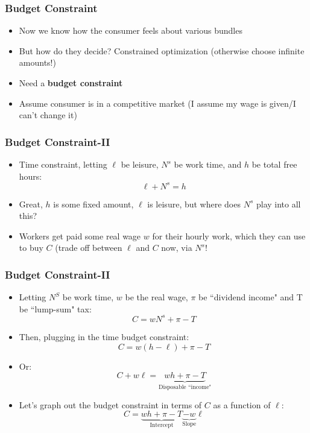 \documentclass{beamer}
\begin{document}
\begin{frame}
\frametitle[alignment=center]{Budget Constraint}
\begin{itemize}
\item Now we know how the consumer feels about various bundles
\bigskip
\item But how do they decide? Constrained optimization (otherwise choose infinite amounts!)
\bigskip
\item Need a \textbf{budget constraint}
\bigskip
\item Assume consumer is in a competitive market (I assume my wage is given/I can't change it)
\end{itemize}
\end{frame}

\begin{frame}
\frametitle[alignment=center]{Budget Constraint-II}
\begin{itemize}
\item Time constraint, letting $\ell$ be leisure, $N^s$ be work time, and $h$ be total free hours:
$$\ell+N^s=h$$
\item Great, $h$ is some fixed amount, $\ell$ is leisure, but where does $N^s$ play into all this?
\bigskip
\item Workers get paid some real wage $w$ for their hourly work, which they can use to buy $C$ (trade off between $\ell$ and $C$ now, via $N^s$!
\end{itemize}
\end{frame}

\begin{frame}
\frametitle[alignment=center]{Budget Constraint-II}
\begin{itemize}
\item Letting $N^S$ be work time, $w$ be the real wage, $\pi$ be ``dividend income" and T be ``lump-sum" tax:
$$C=wN^s+\pi-T$$
\item Then, plugging in the time budget constraint:
$$C=w(h-\ell)+\pi-T$$
\item Or:
$$C+w\ell=\underbrace{wh+\pi-T}_{\text{Disposable ``income"}}$$
\item Let's graph out the budget constraint in terms of $C$ as a function of $\ell$:
$$C=\underbrace{wh+\pi-T}_{\text{Intercept}}\underbrace{-w}_{\text{Slope}}\ell$$
\end{itemize}
\end{frame}
\end{document}
